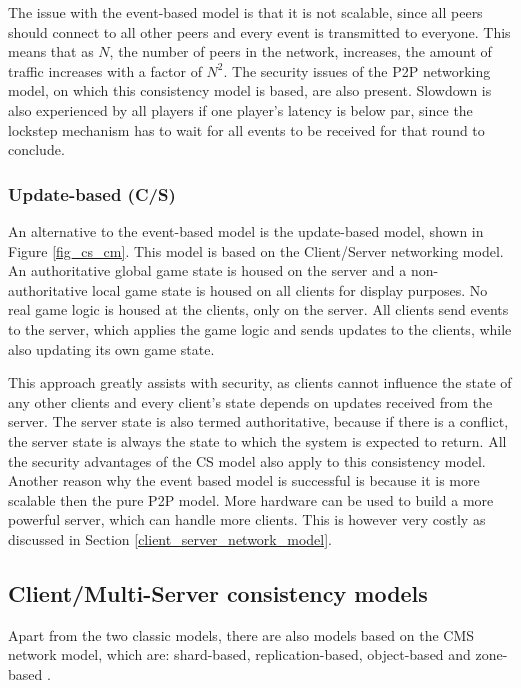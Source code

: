 \documentclass[10pt,a4paper,journal,cspaper,compsoc]{IEEEtran}
\begin{document}
The issue with the event-based model is that it is not scalable, since all peers should connect to all other peers and every event is transmitted to
everyone. This means that as $N$, the number of peers in the network, increases, the amount of traffic increases with a factor of $N^2$. The security
issues of the P2P networking model, on which this consistency model is based, are also present. Slowdown is also experienced by all players if one
player's latency is below par, since the lockstep mechanism has to wait for all events to be received for that round to conclude.

\subsubsection{Update-based (C/S)}
An alternative to the event-based model is the update-based model, shown in Figure \ref{fig_cs_cm}. This model is based on the Client/Server
networking model. An authoritative global game state is housed on the server and a non-authoritative local game state is housed on all clients for
display purposes. No real game logic is housed at the clients, only on the server. All clients send events to the server, which applies the game
logic and sends updates to the clients, while also updating its own game state.

This approach greatly assists with security, as clients cannot influence the state of any other clients and every client's state depends on updates
received from the server. The server state is also termed authoritative, because if there is a conflict, the server state is always the state to
which the system is expected to return. All the security advantages of the \ac{CS} model also apply to this consistency model. Another reason why the
event based model is successful is because it is more scalable then the pure P2P model. More hardware can be used to build a more powerful server,
which can handle more clients. This is however very costly as discussed in Section \ref{client_server_network_model}.

\subsection{Client/Multi-Server consistency models}
\label{cms_models}


Apart from the two classic models, there are also models based on the \ac{CMS} network model, which are: shard-based, replication-based, object-based
and zone-based \cite{Hu_voronoi_IM}.
\end{document}
